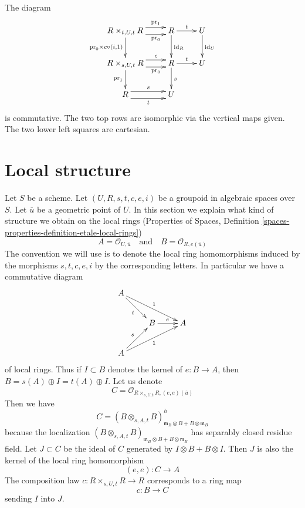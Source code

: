 \medskip\noindent
The diagram
\begin{equation}
\label{equation-pull}
\vcenter{
\xymatrix{
R \times_{t, U, t} R
\ar@<1ex>[r]^-{\text{pr}_1} \ar@<-1ex>[r]_-{\text{pr}_0}
\ar[d]_{\text{pr}_0 \times c \circ (i, 1)} &
R \ar[r]^t \ar[d]^{\text{id}_R} &
U \ar[d]^{\text{id}_U} \\
R \times_{s, U, t} R
\ar@<1ex>[r]^-c \ar@<-1ex>[r]_-{\text{pr}_0} \ar[d]_{\text{pr}_1} &
R \ar[r]^t \ar[d]^s &
U \\
R \ar@<1ex>[r]^s \ar@<-1ex>[r]_t &
U
}
}
\end{equation}
is commutative. The two top rows are isomorphic via the vertical maps given.
The two lower left squares are cartesian.






\section{Local structure}
\label{section-local}

\noindent
Let $S$ be a scheme.
Let $(U, R, s, t, c, e, i)$ be a groupoid in algebraic spaces over $S$.
Let $\overline{u}$ be a geometric point of $U$. In this section we explain what
kind of structure we obtain on the local rings
(Properties of Spaces, Definition
\ref{spaces-properties-definition-etale-local-rings})
$$
A = \mathcal{O}_{U, \overline{u}}
\quad\text{and}\quad
B = \mathcal{O}_{R, e(\overline{u})}
$$
The convention we will use is to denote the local ring homomorphisms
induced by the morphisms $s, t, c, e, i$ by the corresponding letters.
In particular we have a commutative diagram
$$
\xymatrix{
A \ar[rd]_t \ar[rrd]^1 \\
& B \ar[r]^e & A \\
A \ar[ru]^s \ar[rru]_1
}
$$
of local rings. Thus if $I \subset B$ denotes the kernel of $e : B \to A$,
then $B = s(A) \oplus I = t(A) \oplus I$. Let us denote
$$
C = \mathcal{O}_{R \times_{s, U, t} R, (e, e)(\overline{u})}
$$
Then we have
$$
C =
(B \otimes_{s, A, t} B)_{\mathfrak m_B \otimes B + B \otimes \mathfrak m_B}^h
$$
because the localization
$(B \otimes_{s, A, t} B)_{\mathfrak m_B \otimes B + B \otimes \mathfrak m_B}$
has separably closed residue field.
Let $J \subset C$ be the ideal of $C$ generated by $I \otimes B + B \otimes I$.
Then $J$ is also the kernel of the local ring homomorphism
$$
(e, e) : C \longrightarrow A
$$
The composition law $c : R \times_{s, U, t} R \to R$ corresponds to a
ring map
$$
c : B \longrightarrow C
$$
sending $I$ into $J$.

